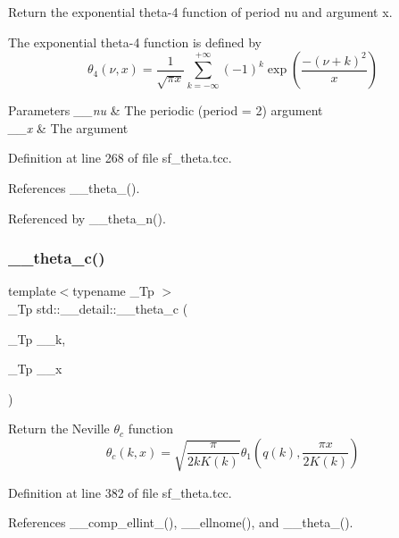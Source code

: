 Return the exponential theta-\/4 function of period {\ttfamily nu} and argument {\ttfamily x}.

The exponential theta-\/4 function is defined by \[ \theta_4(\nu,x) = \frac{1}{\sqrt{\pi x}} \sum_{k=-\infty}^{+\infty} (-1)^k \exp\left( \frac{-(\nu + k)^2}{x} \right) \]


\begin{DoxyParams}{Parameters}
{\em \+\_\+\+\_\+nu} & The periodic (period = 2) argument \\
\hline
{\em \+\_\+\+\_\+x} & The argument \\
\hline
\end{DoxyParams}


Definition at line 268 of file sf\+\_\+theta.\+tcc.



References \+\_\+\+\_\+theta\+\_().



Referenced by \+\_\+\+\_\+theta\+\_\+n().

\mbox{\label{namespacestd_1_1____detail_af95cdf16bfcf6c138d621b0c518a3299}} 
\subsubsection{\texorpdfstring{\+\_\+\+\_\+theta\+\_\+c()}{\_\_theta\_c()}}
{\footnotesize\ttfamily template$<$typename \+\_\+\+Tp $>$ \\
\+\_\+\+Tp std\+::\+\_\+\+\_\+detail\+::\+\_\+\+\_\+theta\+\_\+c (\begin{DoxyParamCaption}\item[{\+\_\+\+Tp}]{\+\_\+\+\_\+k,  }\item[{\+\_\+\+Tp}]{\+\_\+\+\_\+x }\end{DoxyParamCaption})}

Return the Neville $ \theta_c $ function \[ \theta_c(k,x) = \sqrt{\frac{\pi}{2 k K(k)}} \theta_1\left(q(k),\frac{\pi x}{2K(k)}\right) \] 

Definition at line 382 of file sf\+\_\+theta.\+tcc.



References \+\_\+\+\_\+comp\+\_\+ellint\+\_(), \+\_\+\+\_\+ellnome(), and \+\_\+\+\_\+theta\+\_().

